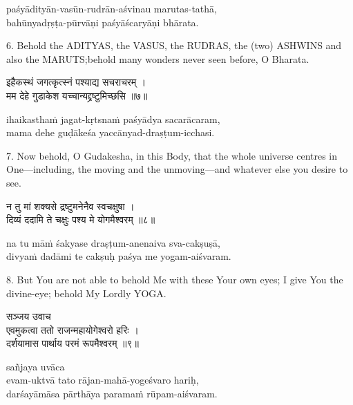 \begin{transliteration}
paśyādityān-vasūn-rudrān-aśvinau marutas-tathā, \\
bahūnyadṛṣṭa-pūrvāṇi paśyāścaryāṇi bhārata.
\end{transliteration}

6. Behold the ADITYAS, the VASUS, the RUDRAS, the (two) ASHWINS and also the
MARUTS;\@ behold many wonders never seen before, O Bharata.

\begin{gitaverse}
इहैकस्थं जगत्कृत्स्नं पश्याद्य सचराचरम् । \\
मम देहे गुडाकेश यच्चान्यद्द्रष्टुमिच्छसि ॥७॥
\end{gitaverse}

\begin{transliteration}
ihaikasthaṁ jagat-kṛtsnaṁ paśyādya sacarācaram, \\
mama dehe guḍākeśa yaccānyad-draṣṭum-icchasi.
\end{transliteration}

7. Now behold, O Gudakesha, in this Body, that the whole universe centres in
One---including, the moving and the unmoving---and whatever else you desire to
see.

\begin{gitaverse}
न तु मां शक्यसे द्रष्टुमनेनैव स्वचक्षुषा । \\
दिव्यं ददामि ते चक्षुः पश्य मे योगमैश्वरम् ॥८॥
\end{gitaverse}

\begin{transliteration}
na tu māṁ śakyase draṣṭum-anenaiva sva-cakṣuṣā, \\
divyaṁ dadāmi te cakṣuḥ paśya me yogam-aiśvaram.
\end{transliteration}

8. But You are not able to behold Me with these Your own eyes; I give You the
divine-eye; behold My Lordly YOGA.\@

\begin{gitaverse}
सञ्जय उवाच \\
एवमुकत्वा ततो राजन्महायोगेश्वरो हरिः । \\
दर्शयामास पार्थाय परमं रूपमैश्वरम् ॥९॥
\end{gitaverse}

\begin{transliteration}
sañjaya uvāca \\
evam-uktvā tato rājan-mahā-yogeśvaro hariḥ, \\
darśayāmāsa pārthāya paramaṁ rūpam-aiśvaram.
\end{transliteration}

